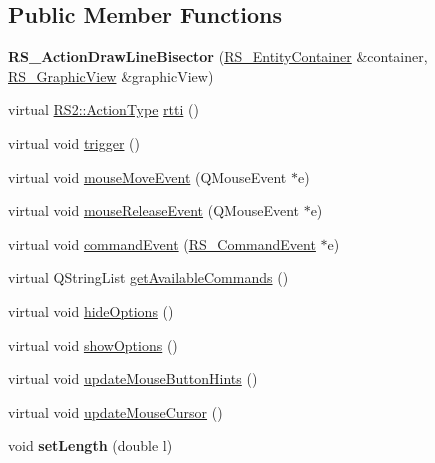 \subsection*{Public Member Functions}
\begin{DoxyCompactItemize}
\item 
\hypertarget{classRS__ActionDrawLineBisector_a71d0d066e51d403e15bfa376c2dc0520}{{\bfseries R\-S\-\_\-\-Action\-Draw\-Line\-Bisector} (\hyperlink{classRS__EntityContainer}{R\-S\-\_\-\-Entity\-Container} \&container, \hyperlink{classRS__GraphicView}{R\-S\-\_\-\-Graphic\-View} \&graphic\-View)}\label{classRS__ActionDrawLineBisector_a71d0d066e51d403e15bfa376c2dc0520}

\item 
virtual \hyperlink{classRS2_afe3523e0bc41fd637b892321cfc4b9d7}{R\-S2\-::\-Action\-Type} \hyperlink{classRS__ActionDrawLineBisector_a2616ae570a0e1b49e8139d276ec6ad2a}{rtti} ()
\item 
virtual void \hyperlink{classRS__ActionDrawLineBisector_af00453c0471ab36159e179c5dab135bc}{trigger} ()
\item 
virtual void \hyperlink{classRS__ActionDrawLineBisector_a2afd19e6b45d2ede2bb9e168a413ee12}{mouse\-Move\-Event} (Q\-Mouse\-Event $\ast$e)
\item 
virtual void \hyperlink{classRS__ActionDrawLineBisector_ac22a60e50e0df4709b02a1e252a87f76}{mouse\-Release\-Event} (Q\-Mouse\-Event $\ast$e)
\item 
virtual void \hyperlink{classRS__ActionDrawLineBisector_afcf7bf2a17c48eaefac6e5d50c82ec99}{command\-Event} (\hyperlink{classRS__CommandEvent}{R\-S\-\_\-\-Command\-Event} $\ast$e)
\item 
virtual Q\-String\-List \hyperlink{classRS__ActionDrawLineBisector_a1b770c2c88a08680c866e0e0c18aacfa}{get\-Available\-Commands} ()
\item 
virtual void \hyperlink{classRS__ActionDrawLineBisector_a9c9b5dfcfd5a1f90d3b9e175614bb853}{hide\-Options} ()
\item 
virtual void \hyperlink{classRS__ActionDrawLineBisector_a9909d450e5d99c0d5b8aed1d8d41e332}{show\-Options} ()
\item 
virtual void \hyperlink{classRS__ActionDrawLineBisector_a204a57805f615eccb68de74f1b630d35}{update\-Mouse\-Button\-Hints} ()
\item 
virtual void \hyperlink{classRS__ActionDrawLineBisector_a653376f7a754a508fc38b6913f0f44dd}{update\-Mouse\-Cursor} ()
\item 
\hypertarget{classRS__ActionDrawLineBisector_a291b58ea27bb1c05338d36d3a720b8e5}{void {\bfseries set\-Length} (double l)}\label{classRS__ActionDrawLineBisector_a291b58ea27bb1c05338d36d3a720b8e5}


\end{DoxyCompactItemize}
